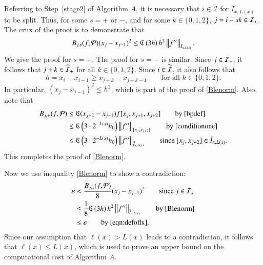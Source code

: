 \documentclass[review]{elsarticle}
\newcommand{\abstol}{\varepsilon}
\theoremstyle{definition}
\begin{document}
Referring to Step~\ref{stage2} of Algorithm $A$, it is necessary that $i \in
\widetilde{\mathcal{I}}$ for $I_{x,L(x)}$ to be split. Thus, for some $s =+$ or
$-$, and for some $k \in \{0,1,2\}$, $j = i - sk \in \ci_s$. The crux of the
proof is to demonstrate that
\begin{equation} \label{Blenorm}
B_{j,s}(f,\cp)(x_j-x_{j-1})^2 \le  \fC\left(3h\right) h^2  \norm[\bar{I}_{x,L(x)}]{f''}.
\end{equation}
We give the proof for  $s =+$.  The proof for $s= -$ is similar.  Since $j \in \ci_+$, it follows that $j + k \in \widehat{\ci}_+$ for all $k \in \{0,1,2\}$. Since $i \in \widetilde{\ci}$, it also follows that
\begin{equation} \label{conditionone}
h = x_{i} - x_{i-1} \ge x_{j+k} - x_{j+k-1} \qquad \text{for all } k \in \{0,1,2\}.
\end{equation}
In particular, $(x_j-x_{j-1})^2 \le h^2$, which is part of the proof of
\eqref{Blenorm}. Also, note that
  \begin{align*}
  B_{j,+}(f,\cp)
  & \le \fC(x_{j+2}-x_{j-1})f[x_{j},x_{j+1},x_{j+2}] \qquad \text{by}~\eqref{bpdef} \\
  &\le  \fC\left(3\cdot2^{-L(x)}h_0\right) \norm[{[x_{j},x_{j+2}]}]{f''} \qquad \text{by}~\eqref{conditionone} \\
  & \le   \fC\left(3\cdot2^{-L(x)}h_0\right)  \norm[\bar{I}_{x,L(x)}]{f''}  \qquad \text{since}~[x_{j},x_{j+2}] \in \bar{I}_{x,L(x)} .
  \end{align*}
This completes the proof of \eqref{Blenorm}.

Now we use inequality \eqref{Blenorm} to show a contradiction:
 \begin{align*}
 \abstol & <  \frac{B_{j,s}(f,\cp)}{8}(x_j-x_{j-1})^2 \qquad \text{since}~j \in \ci_s\\
 & \le   \frac 1 8 \fC\left(3h\right) h^2  \norm[\bar{I}_{x,L(x)}]{f''}  \qquad \text{by}~\eqref{Blenorm} \\
 & \le    \abstol \qquad \text{by}~\eqref{eqn:defoflx} .
 \end{align*}
Since our assumption that $\ell(x) > L(x)$ leads to a contradiction, it follows
that $\ell(x) \le L(x)$, which is used to prove an upper bound on the
computational cost of Algorithm $A$.
\end{document}
